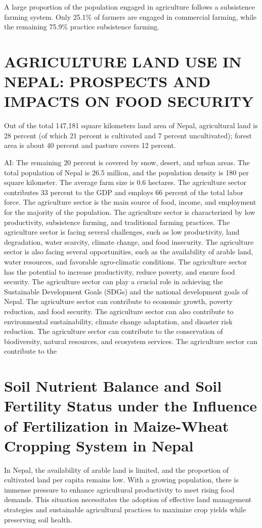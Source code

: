 \documentclass[a4paper,12pt]{article}
\begin{document}
A large proportion of the population engaged in agriculture follows a subsistence farming system. Only 25.1\% of farmers are engaged in commercial farming, while the remaining 75.9\% practice subsistence farming.





\section{AGRICULTURE LAND USE IN NEPAL: PROSPECTS AND IMPACTS ON FOOD SECURITY}
\parencite{timilsinaAGRICULTURELANDUSE2019}
Out of the total 147,181 square kilometers land area of Nepal, agricultural land is 28 percent (of which 21 percent is cultivated and 7 percent uncultivated); forest area is about 40 percent and pasture covers 12 percent.

AI: The remaining 20 percent is covered by snow, desert, and urban areas. The total population of Nepal is 26.5 million, and the population density is 180 per square kilometer. The average farm size is 0.6 hectares. The agriculture sector contributes 33 percent to the GDP and employs 66 percent of the total labor force. The agriculture sector is the main source of food, income, and employment for the majority of the population. The agriculture sector is characterized by low productivity, subsistence farming, and traditional farming practices. The agriculture sector is facing several challenges, such as low productivity, land degradation, water scarcity, climate change, and food insecurity. The agriculture sector is also facing several opportunities, such as the availability of arable land, water resources, and favorable agro-climatic conditions. The agriculture sector has the potential to increase productivity, reduce poverty, and ensure food security. The agriculture sector can play a crucial role in achieving the Sustainable Development Goals (SDGs) and the national development goals of Nepal. The agriculture sector can contribute to economic growth, poverty reduction, and food security. The agriculture sector can also contribute to environmental sustainability, climate change adaptation, and disaster risk reduction. The agriculture sector can contribute to the conservation of biodiversity, natural resources, and ecosystem services. The agriculture sector can contribute to the

\section{Soil Nutrient Balance and Soil Fertility Status under the Influence of Fertilization in Maize-Wheat Cropping System in Nepal}
\parencite{@rawalSoilNutrientBalance2022}
In Nepal, the availability of arable land is limited, and the proportion of cultivated land per capita remains low. With a growing population, there is immense pressure to enhance agricultural productivity to meet rising food demands. This situation necessitates the adoption of effective land management strategies and sustainable agricultural practices to maximize crop yields while preserving soil health.
\end{document}
